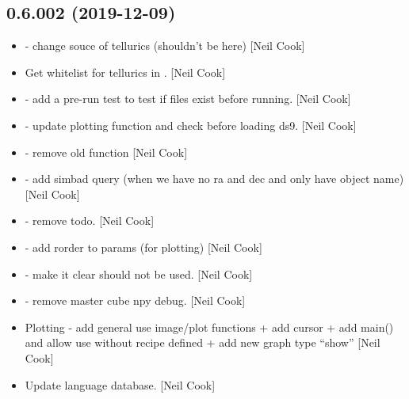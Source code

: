 \documentclass[a4paper,10pt,english]{report}
\begin{document}
\subsection{0.6.002 (2019-12-09)}
\label{\detokenize{misc/changelog:id17}}\begin{itemize}
\item {} 
 - change souce of tellurics (shouldn’t be
here) {[}Neil Cook{]}

\item {} 
Get whitelist for tellurics in . {[}Neil Cook{]}

\item {} 
 - add a pre-run test to test if
files exist before running. {[}Neil Cook{]}

\item {} 
 - update plotting function and
check before loading ds9. {[}Neil Cook{]}

\item {} 
 - remove old function 
{[}Neil Cook{]}

\item {} 
 - add simbad query (when we have no ra
and dec and only have object name) {[}Neil Cook{]}

\item {} 
 - remove todo. {[}Neil Cook{]}

\item {} 
 - add rorder to params (for plotting)
{[}Neil Cook{]}

\item {} 
 - make it clear 
should not be used. {[}Neil Cook{]}

\item {} 
 - remove master cube npy
debug. {[}Neil Cook{]}

\item {} 
Plotting - add general use image/plot functions + add cursor + add
main() and allow use without recipe defined + add new graph type
“show” {[}Neil Cook{]}

\item {} 
Update language database. {[}Neil Cook{]}


\end{itemize}
\end{document}
